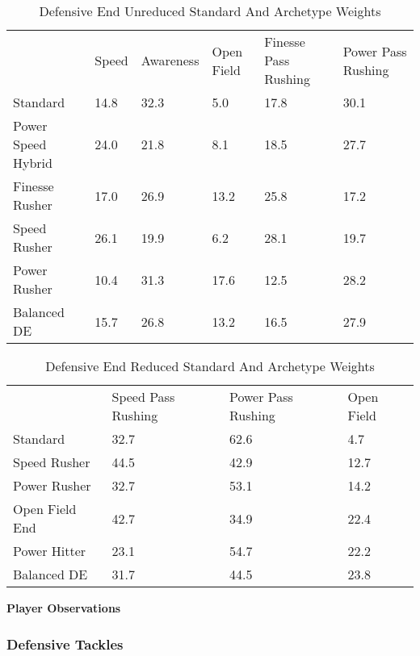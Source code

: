 \documentclass[11pt]{article}
\begin{document}
\begin{table}[]
\centering
\caption{Defensive End Unreduced Standard And Archetype Weights}
\label{DefensiveEndUnreducedWeights}
\begin{tabular}{llllll}
                   & Speed & Awareness & Open Field & Finesse Pass Rushing & Power Pass Rushing \\
Standard           & 14.8  & 32.3      & 5.0        & 17.8                 & 30.1               \\
Power Speed Hybrid & 24.0  & 21.8      & 8.1        & 18.5                 & 27.7               \\
Finesse Rusher     & 17.0  & 26.9      & 13.2       & 25.8                 & 17.2               \\
Speed Rusher       & 26.1  & 19.9      & 6.2        & 28.1                 & 19.7               \\
Power Rusher       & 10.4  & 31.3      & 17.6       & 12.5                 & 28.2               \\
Balanced DE        & 15.7  & 26.8      & 13.2       & 16.5                 & 27.9              
\end{tabular}
\end{table}

\begin{table}[]
\centering
\caption{Defensive End Reduced Standard And Archetype Weights}
\label{DefensiveEndReducedWeights}
\begin{tabular}{llll}
               & Speed Pass Rushing & Power Pass Rushing & Open Field \\
Standard       & 32.7               & 62.6               & 4.7        \\
Speed Rusher   & 44.5               & 42.9               & 12.7       \\
Power Rusher   & 32.7               & 53.1               & 14.2       \\
Open Field End & 42.7               & 34.9               & 22.4       \\
Power Hitter   & 23.1               & 54.7               & 22.2       \\
Balanced DE    & 31.7               & 44.5               & 23.8      
\end{tabular}
\end{table}

\textbf{Player Observations}

\subsubsection{Defensive Tackles}
\end{document}
